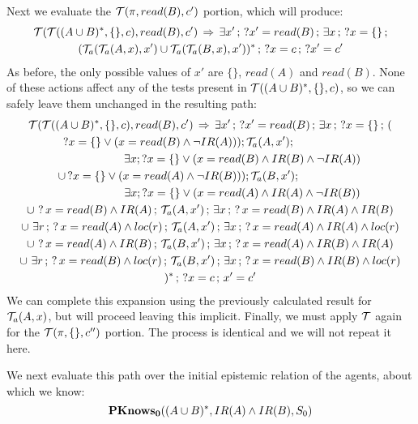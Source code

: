 Next we evaluate the $\mathcal{T}(\pi,read(B),c')$ portion, which will produce:\begin{multline*}
\mathcal{T}(\mathcal{T}((A\cup B)^{*},\{\},c),read(B),c')\,\Rightarrow\,\exists x'\,;\,?x'=read(B)\,;\,\exists x\,;\,?x=\{\}\,;\\
(\mathcal{T}_{a}(\mathcal{T}_{a}(A,x),x')\cup\mathcal{T}_{a}(\mathcal{T}_{a}(B,x),x'))^{*}\,;\,?x=c\,;\,?x'=c'\end{multline*}
 As before, the only possible values of $x'$ are $\{\}$, $read(A)$
and $read(B)$. None of these actions affect any of the tests present
in $\mathcal{T}((A\cup B)^{*},\{\},c)$, so we can safely leave them unchanged
in the resulting path:\begin{multline*}
\mathcal{T}(\mathcal{T}((A\cup B)^{*},\{\},c),read(B),c')\,\Rightarrow\,\exists x'\,;\,?x'=read(B)\,;\,\exists x\,;\,?x=\{\}\,;\,(\\
?x=\{\}\vee(x=read(B)\wedge\neg IR(A)));\mathcal{T}_{a}(A,x');\,\,\,\,\,\,\,\,\,\,\,\,\,\,\,\,\,\,\,\,\,\,\,\,\,\,\,\,\,\,\,\,\,\,\\
\,\,\,\,\,\,\,\,\,\,\,\,\,\,\,\,\,\,\,\,\,\,\,\,\,\,\,\,\,\,\,\,\,\,\exists x;?x=\{\}\vee(x=read(B)\wedge IR(B)\wedge\neg IR(A))\\
\cup\,?x=\{\}\vee(x=read(A)\wedge\neg IR(B)));\mathcal{T}_{a}(B,x');\,\,\,\,\,\,\,\,\,\,\,\,\,\,\,\,\,\,\,\,\,\,\,\,\,\,\,\,\,\,\,\,\,\,\\
\,\,\,\,\,\,\,\,\,\,\,\,\,\,\,\,\,\,\,\,\,\,\,\,\,\,\,\,\,\,\,\,\,\,\exists x;?x=\{\}\vee(x=read(A)\wedge IR(A)\wedge\neg IR(B))\\
\cup\,\,?\, x=read(B)\wedge IR(A)\,;\,\mathcal{T}_{a}(A,x')\,;\,\exists x\,;\,?\, x=read(B)\wedge IR(A)\wedge IR(B)\\
\cup\,\,\exists r\,;\,?\, x=read(A)\wedge loc(r)\,;\,\mathcal{T}_{a}(A,x')\,;\,\exists x\,;\,?\, x=read(A)\wedge IR(A)\wedge loc(r)\\
\cup\,\,?\, x=read(A)\wedge IR(B)\,;\,\mathcal{T}_{a}(B,x')\,;\,\exists x\,;\,?\, x=read(A)\wedge IR(B)\wedge IR(A)\\
\cup\,\,\exists r\,;\,?\, x=read(B)\wedge loc(r)\,;\,\mathcal{T}_{a}(B,x')\,;\,\exists x\,;\,?\, x=read(B)\wedge IR(B)\wedge loc(r)\\
)^{*}\,;\,?x=c\,;\, x'=c'\end{multline*}
 We can complete this expansion using the previously calculated result
for $\mathcal{T}_{a}(A,x)$, but will proceed leaving this implicit. Finally,
we must apply $\mathcal{T}$ again for the $\mathcal{T}(\pi,\{\},c'')$ portion.
The process is identical and we will not repeat it here.

We next evaluate this path over the initial epistemic relation of
the agents, about which we know:\[
\mathbf{PKnows_{0}}((A\cup B)^{*},IR(A)\wedge IR(B),S_{0})\]


